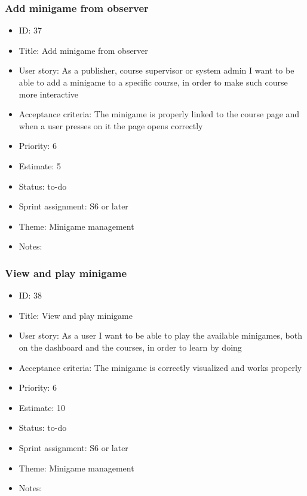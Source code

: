 \subsubsection{Add minigame from observer}
\begin{itemize}
	\item ID: 37
	\item Title: Add minigame from observer
	\item User story: As a publisher, course supervisor or system admin I want to be able to add a minigame to a specific course, in order to make such course more interactive
	\item Acceptance criteria: The minigame is properly linked to the course page and when a user presses on it the page opens correctly
	\item Priority: 6
	\item Estimate: 5
	\item Status: to-do
	\item Sprint assignment: S6 or later
	\item Theme: Minigame management
	\item Notes:
\end{itemize}

\subsubsection{View and play minigame}
\begin{itemize}
	\item ID: 38
	\item Title: View and play minigame
	\item User story: As a user I want to be able to play the available minigames, both on the dashboard and the courses, in order to learn by doing
	\item Acceptance criteria: The minigame is correctly visualized and works properly
	\item Priority: 6
	\item Estimate: 10
	\item Status: to-do
	\item Sprint assignment: S6 or later
	\item Theme: Minigame management
	\item Notes:
\end{itemize}

